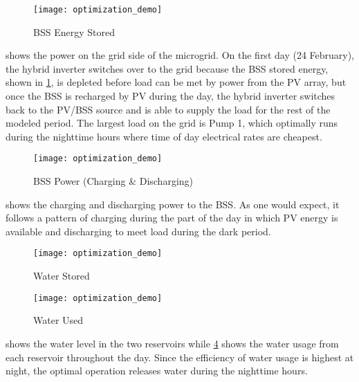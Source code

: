 \begin{figure}[t]
	\centering
	\texttt{[image: optimization\_demo]}
	\caption{BSS Energy Stored}
	\label{fig:bss-energy}
\end{figure}

 shows the power on the grid side of the microgrid.
On the first day (24 February), the hybrid inverter switches over to the grid because the BSS stored energy, shown in \cref{fig:bss-energy}, is depleted before load can be met by power from the PV array, but once the BSS is recharged by PV during the day, the hybrid inverter switches back to the PV/BSS source and is able to supply the load for the rest of the modeled period.
The largest load on the grid is Pump 1, which optimally runs during the nighttime hours where time of day electrical rates are cheapest.


\begin{figure}[t]
	\centering
	\texttt{[image: optimization\_demo]}
	\caption{BSS Power (Charging \& Discharging)}
	\label{fig:bss-power}
\end{figure}

 shows the charging and discharging power to the BSS.
As one would expect, it follows a pattern of charging during the part of the day in which PV energy is available and discharging to meet load during the dark period.


\begin{figure}[t]
	\centering
	\texttt{[image: optimization\_demo]}
	\caption{Water Stored}
	\label{fig:water-level}
\end{figure}

\begin{figure}[t]
	\centering
	\texttt{[image: optimization\_demo]}
	\caption{Water Used}
	\label{fig:water-used}
\end{figure}

 shows the water level in the two reservoirs while \cref{fig:water-used} shows the water usage from each reservoir throughout the day.
Since the efficiency of water usage is highest at night, the optimal operation releases water during the nighttime hours.



